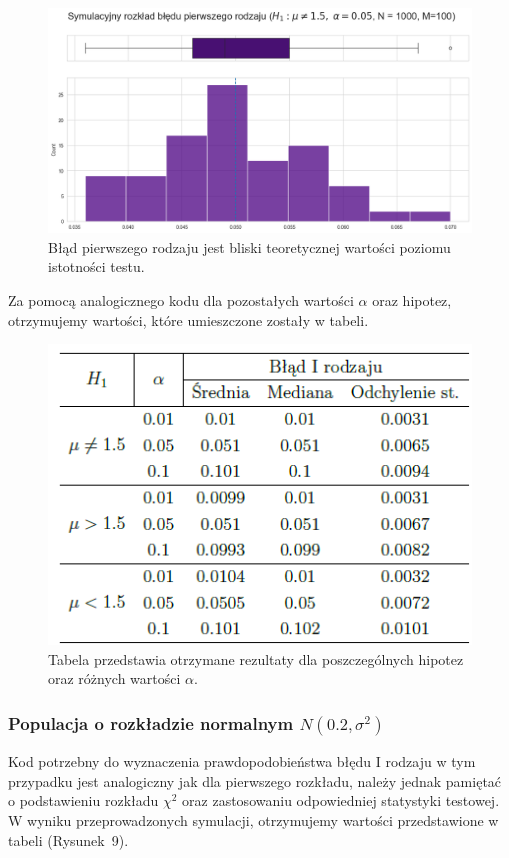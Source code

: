 \documentclass{article}
\begin{document}
\begin{figure}[H]
    \centering
    \includegraphics[scale=0.42]{22.png}
    \caption{Błąd pierwszego rodzaju jest bliski teoretycznej wartości poziomu istotności testu.}
    \label{fig:6}
\end{figure}
Za pomocą analogicznego kodu dla pozostałych wartości $\alpha$ oraz hipotez, otrzymujemy wartości, które umieszczone zostały w tabeli.
\begin{figure}[H]
    \centering
    \includegraphics[scale=0.65]{tabelka_srednia1.png}
    \caption{Tabela przedstawia otrzymane rezultaty dla poszczególnych hipotez oraz różnych wartości $\alpha$.}
    \label{fig:6}
\end{figure}



\subsubsection{Populacja o rozkładzie normalnym $N(0.2, \sigma^2)$}
Kod potrzebny do wyznaczenia prawdopodobieństwa błędu I rodzaju w tym przypadku jest analogiczny jak dla pierwszego rozkładu, należy jednak pamiętać o podstawieniu rozkładu $\chi^2$ oraz zastosowaniu odpowiedniej statystyki testowej. W wyniku przeprowadzonych symulacji, otrzymujemy wartości przedstawione w tabeli (Rysunek~9).
\end{document}
